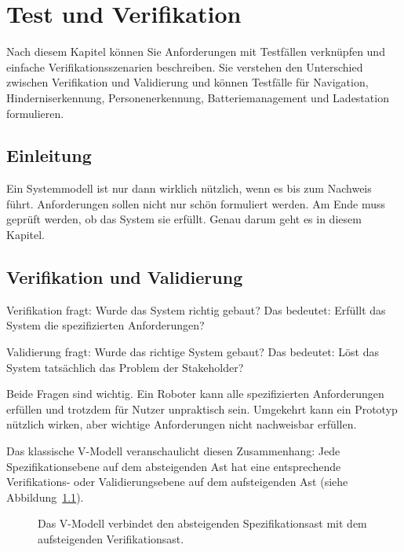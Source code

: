 \chapter{Test und Verifikation}

\begin{lernziele}
Nach diesem Kapitel können Sie Anforderungen mit Testfällen verknüpfen und einfache Verifikationsszenarien beschreiben. Sie verstehen den Unterschied zwischen Verifikation und Validierung und können Testfälle für Navigation, Hinderniserkennung, Personenerkennung, Batteriemanagement und Ladestation formulieren.
\end{lernziele}

\section{Einleitung}
Ein Systemmodell ist nur dann wirklich nützlich, wenn es bis zum Nachweis führt. Anforderungen sollen nicht nur schön formuliert werden. Am Ende muss geprüft werden, ob das System sie erfüllt. Genau darum geht es in diesem Kapitel.

\section{Verifikation und Validierung}
Verifikation fragt: Wurde das System richtig gebaut? Das bedeutet: Erfüllt das System die spezifizierten Anforderungen?

Validierung fragt: Wurde das richtige System gebaut? Das bedeutet: Löst das System tatsächlich das Problem der Stakeholder?

Beide Fragen sind wichtig. Ein Roboter kann alle spezifizierten Anforderungen erfüllen und trotzdem für Nutzer unpraktisch sein. Umgekehrt kann ein Prototyp nützlich wirken, aber wichtige Anforderungen nicht nachweisbar erfüllen.

Das klassische V-Modell veranschaulicht diesen Zusammenhang: Jede Spezifikationsebene auf dem absteigenden Ast hat eine entsprechende Verifikations- oder Validierungsebene auf dem aufsteigenden Ast (siehe Abbildung~\ref{fig:kap19-v-modell}).

\begin{figure}[H]
  \centering
  \caption{Das V-Modell verbindet den absteigenden Spezifikationsast mit dem aufsteigenden Verifikationsast.}
  \label{fig:kap19-v-modell}
\end{figure}

